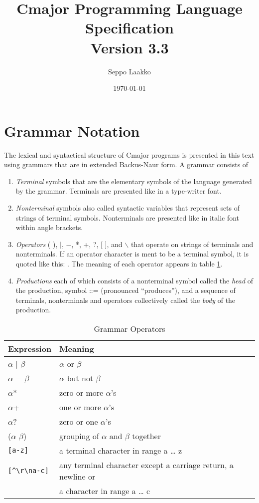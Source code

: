 \documentclass[a4paper,oneside,11pt]{article}
\begin{document}
\title{Cmajor Programming Language Specification\\Version 3.3}
\author{Seppo Laakko}
\date{\today}
\maketitle
\tableofcontents

\clearpage

\section{Grammar Notation}

The lexical and syntactical structure of Cmajor programs is presented in this text
using grammars that are in extended Backus-Naur form.
A grammar consists of

\begin{enumerate}
\item
\emph{Terminal} symbols that are the elementary symbols of the language generated by the grammar.
Terminals are presented like  in a type-writer font.
\item
\emph{Nonterminal} symbols also called syntactic variables that represent sets of strings of terminal symbols.
Nonterminals are presented like  in italic font within angle brackets.
\item
\emph{Operators} ( ), $|$, $-$, *, +, ?, [ ], and $\backslash$ that operate on strings of terminals and nonterminals.
If an operator character is ment to be a terminal symbol, it is quoted like this: \lit{*}.
The meaning of each operator appears in table \ref{tab:operators}.
\item
\emph{Productions} each of which consists of a nonterminal symbol called the \emph{head} of the production, symbol ::= (pronounced ``produces''), and
a sequence of terminals, nonterminals and operators collectively called the \emph{body} of the production.
\end{enumerate}

\begin{table}[htb]
\caption{Grammar Operators}\label{tab:operators}
\begin{tabular}{ll}
\bf{Expression}& \bf{Meaning}\\
\hline
$\alpha$ $|$ $\beta$ & $\alpha$ or $\beta$\\
$\alpha$ $-$ $\beta$ & $\alpha$ but not $\beta$\\
$\alpha$* & zero or more $\alpha$'s\\
$\alpha$+ & one or more $\alpha$'s\\
$\alpha$? & zero or one $\alpha$'s\\
($\alpha$ $\beta$) & grouping of $\alpha$ and $\beta$ together\\
\verb|[a-z]| & a terminal character in range a \ldots{} z\\
\verb|[^\r\na-c]| & any terminal character except a carriage return, a newline or\\& a character in range a \ldots{} c\\
\end{tabular}
\end{table}
\end{document}
